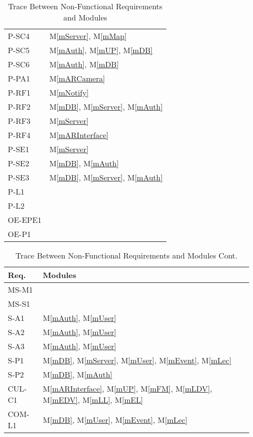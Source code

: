 \documentclass[12pt, titlepage]{article}
\newcommand{\mref}[1]{M\ref{#1}}
\begin{document}
\begin{table}[H]
\begin{tabular}{p{} p{}}
P-SC4 & \mref{mServer}, \mref{mMap}\\
P-SC5 & \mref{mAuth}, \mref{mUP}, \mref{mDB}\\
P-SC6 & \mref{mAuth}, \mref{mDB}\\
P-PA1 & \mref{mARCamera}\\
P-RF1 & \mref{mNotify}\\
P-RF2 & \mref{mDB}, \mref{mServer}, \mref{mAuth}\\
P-RF3 & \mref{mServer}\\
P-RF4 & \mref{mARInterface}\\
P-SE1 & \mref{mServer}\\
P-SE2 & \mref{mDB}, \mref{mAuth}\\
P-SE3 & \mref{mDB}, \mref{mServer}, \mref{mAuth}\\
P-L1 & \\
P-L2 & \\
OE-EPE1 & \\
OE-P1 & \\
\bottomrule
\end{tabular}
\caption{Trace Between Non-Functional Requirements and Modules}
\label{TblNFRT}
\end{table}

\begin{table}[H]
\centering
\begin{tabular}{p{} p{}}
\toprule
\textbf{Req.} & \textbf{Modules}\\
\midrule
MS-M1 & \\
MS-S1 & \\
S-A1 & \mref{mAuth}, \mref{mUser}\\
S-A2 & \mref{mAuth}, \mref{mUser}\\
S-A3 & \mref{mAuth}, \mref{mUser}\\
S-P1 & \mref{mDB}, \mref{mServer}, \mref{mUser}, \mref{mEvent}, \mref{mLec}\\
S-P2 & \mref{mDB}, \mref{mAuth}\\
CUL-C1 & \mref{mARInterface}, \mref{mUP}, \mref{mFM}, \mref{mLDV}, \mref{mEDV}, \mref{mLL}, \mref{mEL}\\
COM-L1 & \mref{mDB}, \mref{mUser}, \mref{mEvent}, \mref{mLec}\\
\bottomrule
\end{tabular}
\caption{Trace Between Non-Functional Requirements and Modules Cont.}
\label{TblNFRT-CONT}
\end{table}
\end{document}
